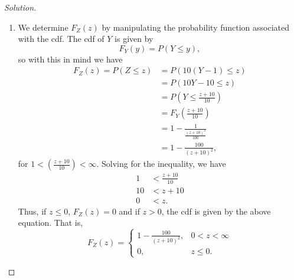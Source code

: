 \documentclass[12pt]{article}
\theoremstyle{definition}
\theoremstyle{plain}
\newenvironment{solution}
  {\begin{proof}[Solution]}
  {\end{proof}}
\begin{document}
\begin{enumerate}
\begin{solution}
\begin{enumerate}
\item We determine $ F_Z(z) $ by manipulating the probability function associated with the cdf. The cdf of $ Y $ is given by 
\[ F_Y(y) = P(Y \leq y), \]
so with this in mind we have
\begin{align*}
	F_Z(z) = P(Z \leq z) &= P(10(Y - 1) \leq z)\\
	&= P(10Y - 10 \leq z)\\
	&= P(Y \leq \frac{z + 10}{10})\\
	&= F_Y(\frac{z+ 10}{10})\\
	&= 1 - \frac{1}{\frac{(z + 10)^2}{100}}\\
	&= 1 - \frac{100}{(z + 10)^2},
\end{align*}
for $1 < (\frac{z+10}{10}) < \infty$. Solving for the inequality, we have 
\begin{align*}
	1 &< \frac{z + 10}{10}\\
	10 &<  z + 10\\
	0 &< z.
\end{align*} 
Thus, if $ z \leq 0 $, $ F_Z(z) = 0 $ and if $ z > 0 $, the cdf is given by the above equation. That is,
\[ F_Z(z) = \begin{cases}
	1 - \frac{100}{(z + 10)^2}, & 0 < z < \infty\\
	0, &z \leq 0.
\end{cases} \]
\end{enumerate}

\end{solution}
\end{enumerate}
\end{document}
